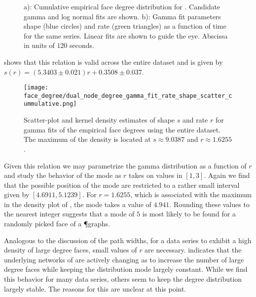 		\begin{figure}
			\centering
			\qquad

			\caption[Face degree distribution]{a): Cumulative empirical face degree distribution for . Candidate gamma and log normal fits are shown. b): Gamma fit parameters shape (blue circles) and rate (green triangles) as a function of time for the same series. Linear fits are shown to guide the eye. Abscissa in units of $120$ seconds.}
			\label{fig:face_degree_fit}
		\end{figure}

		 shows that this relation is valid across the entire dataset and is given by $s(r) = (5.3403 \pm 0.021) r + 0.3508 \pm 0.037$.
 
		\begin{figure}[!htbp]
			\centering
				\texttt{[image: face\_degree/dual\_node\_degree\_gamma\_fit\_rate\_shape\_scatter\_cummulative.png]}
			\caption[Face degree distribution fit parameter densities.]{Scatter-plot and kernel density estimates of shape $s$ and rate $r$ for gamma fits of the empirical face degrees using the entire dataset. The maximum of the density is located at $s \approx 9.0387$ and $r \approx 1.6255$.}
			\label{fig:face_degree_kde}
		\end{figure}

		Given this relation we may parametrize the gamma distribution as a function of $r$ and study the behavior of the mode as $r$ takes on values in $[1,3]$. Again we find that the possible position of the mode are restricted to a rather small interval given by $[4.6911,5.1239]$. For $r = 1.6255$, which is associated with the maximum in the density plot of , the mode takes a value of $4.941$. Rounding these values to the nearest integer suggests that a mode of $5$ is most likely to be found for a randomly picked face of a \P graphs.

		Analogous to the discussion of the path widths, for a data series to exhibit a high density of large degree faces, small values of $r$ are necessary.  indicates that the underlying networks of  are actively changing as to increase the number of large degree faces while keeping the distribution mode largely constant. While we find this behavior for many data series, others seem to keep the degree distribution largely stable. The reasons for this are unclear at this point.


